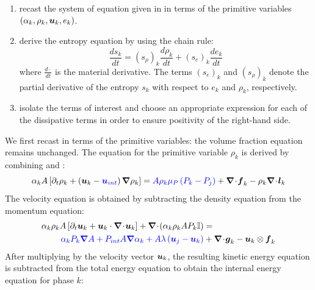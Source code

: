 \begin{enumerate}
\item recast the system of equation given in  in terms of the primitive variables $(\alpha_k, \rho_k, \boldsymbol u_k, e_k)$.
\item derive the entropy equation by using the chain rule:
\begin{equation}
\label{eq:chain_rule-sct4}
\frac{ds_k}{dt} = \left( s_{\rho} \right)_k \frac{d \rho_k}{dt} + \left( s_{e} \right)_k \frac{d e_k}{dt} 
\end{equation}
where $\frac{d \cdot}{dt}$ is the material derivative. The terms $(s_e)_k$ and $(s_{\rho})_k$ denote the partial derivative of the entropy $s_k$ with respect to $e_k$ and $\rho_k$, respectively.
\item isolate the terms of interest and choose an appropriate expression for each of the dissipative terms in order to ensure positivity of the right-hand side.
\end{enumerate}
%
We first recast  in terms of the primitive variables: the volume fraction equation remains unchanged. The equation for the primitive variable $\rho_k$ is derived by combining  and :
%
\begin{equation}\label{eq:rho-7-eqn-model-sect4}
\alpha_k A \left[ \partial_t \rho_k + \left( \boldsymbol u_k - \textcolor{blue}{\boldsymbol u_{int}} \right) \boldsymbol{\nabla} \rho_k \right] = \textcolor{blue}{A \rho_k \mu_P \left( P_k - P_j \right)} + \boldsymbol{\nabla}\! \cdot \! \boldsymbol f_k - \rho_k \boldsymbol{\nabla}\! \cdot \! \boldsymbol l_k
\end{equation}
%
The velocity equation is obtained by subtracting the density equation from the momentum equation:
%
\begin{align}\label{eq:vel-7-eqn-model-sect4}
\alpha_k \rho_k  A \left[ \partial_t \boldsymbol u_k + \boldsymbol u_k \cdot \boldsymbol{\nabla}\! \cdot \! \boldsymbol u_k \right]  + \boldsymbol{\nabla}\! \cdot \! \left( \alpha_k \rho_k A P_k \mathbb{I} \right) &=\nonumber\\
\textcolor{blue}{\alpha_k P_k \boldsymbol{\nabla} A + P_{int} A \boldsymbol{\nabla} \alpha_k + A \lambda \left( \boldsymbol u_j - \boldsymbol u_k \right)} &+ \boldsymbol{\nabla}\! \cdot \! \boldsymbol g_k - \boldsymbol u_k \otimes \boldsymbol f_k
\end{align}
%
After multiplying  by the velocity vector $\boldsymbol u_k$, the resulting kinetic energy equation is subtracted from the total energy equation to obtain the internal energy equation for phase $k$:
%
